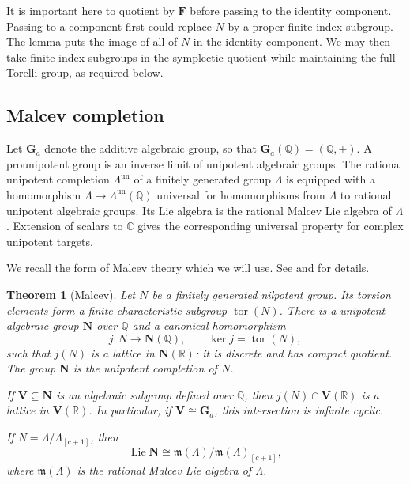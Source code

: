 \documentclass[11pt,a4paper]{article}
\newtheorem{theorem}{Theorem}[section]
\theoremstyle{definition}
\newcommand{\R}{\mathbb R}
\newcommand{\Q}{\mathbb Q}
\newcommand{\C}{\mathbb C}
\newcommand{\tor}{\operatorname{tor}}
\newcommand{\Ga}{\mathbf G_a}
\newcommand{\Lie}{\operatorname{Lie}}
\newcommand{\un}{\mathrm{un}}
\begin{document}
It is important here to quotient by \(\mathbf F\) before passing to
the identity component. Passing to a component first could replace
\(N\) by a proper finite-index subgroup. The lemma puts the image of
all of \(N\) in the identity component. We may then take finite-index
subgroups in the symplectic quotient while maintaining the full Torelli
group, as required below.

\subsection{Malcev completion}

Let \(\Ga\) denote the additive algebraic group, so that
\(\Ga(\Q)=(\Q,+)\). A prounipotent group is an inverse limit of
unipotent algebraic groups. The rational unipotent completion
\(\Lambda^{\un}\) of a finitely generated group \(\Lambda\) is
equipped with a homomorphism
\(\Lambda\to\Lambda^{\un}(\Q)\) universal for homomorphisms
from \(\Lambda\) to rational unipotent algebraic groups. Its Lie
algebra is the rational Malcev Lie algebra of \(\Lambda\).
Extension of scalars to \(\C\) gives the corresponding universal
property for complex unipotent targets.

We recall the form of Malcev theory which we will use. See
\cite[Chapter~II, Theorems~2.12 and~2.18, and Remark~2.16]{Raghunathan}
and \cite[Section~4]{HainMatsumoto} for details.

\begin{theorem}[Malcev]\label{thm:malcev}
Let \(N\) be a finitely generated nilpotent group. Its torsion
elements form a finite characteristic subgroup \(\tor(N)\). There
is a unipotent algebraic group \(\mathbf N\) over \(\Q\) and a
canonical homomorphism
\[
 j:N\longrightarrow\mathbf N(\Q),\qquad \ker j=\tor(N),
\]
such that \(j(N)\) is a lattice in \(\mathbf N(\R)\): it is
discrete and has compact quotient. The group \(\mathbf N\) is the
unipotent completion of \(N\).

If \(\mathbf V\subseteq\mathbf N\) is an algebraic subgroup defined over \(\Q\), then
\(j(N)\cap\mathbf V(\R)\) is a lattice in \(\mathbf V(\R)\).
In particular, if \(\mathbf V\cong\Ga\), this intersection is
infinite cyclic.

If \(N=\Lambda/\Lambda_{[c+1]}\), then
\[
 \Lie\mathbf N\cong
 \mathfrak m(\Lambda)/\mathfrak m(\Lambda)_{[c+1]},
\]
where \(\mathfrak m(\Lambda)\) is the rational Malcev Lie algebra
of \(\Lambda\).

\end{theorem}
\end{document}
